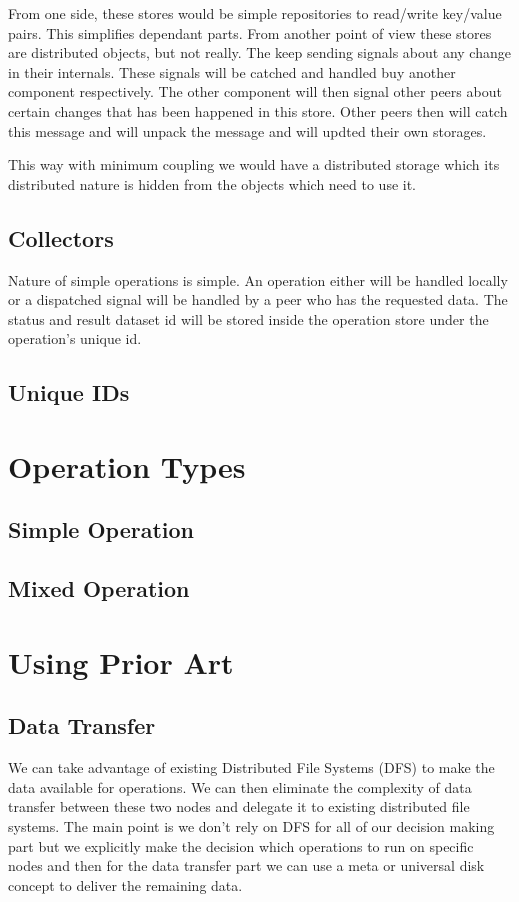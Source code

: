 From one side, these stores would be simple repositories to read/write key/value pairs.
This simplifies dependant parts.
From another point of view these stores are distributed objects, but not really.
The keep sending signals about any change in their internals.
These signals will be catched and handled buy another component respectively.
The other component will then signal other peers about certain changes that has been happened in this store.
Other peers then will catch this message and will unpack the message and will updted their own storages.

This way with minimum coupling we would have a distributed storage which its distributed nature is hidden from
the objects which need to use it.

\subsection{Collectors}
Nature of simple operations is simple. 
An operation either will be handled locally or a dispatched signal will be handled
by a peer who has the requested data. 
The status and result dataset id will be stored inside the operation store under the operation's unique id.



\subsection{Unique IDs}


\section{Operation Types}
\subsection{Simple Operation}
\subsection{Mixed Operation}

\section{Using Prior Art}
\subsection{Data Transfer}
We can take advantage of existing Distributed File Systems
(DFS) to make the data available for operations. We can then eliminate
the complexity of data transfer between these two nodes and delegate it
to existing distributed file systems. The main point is we don't rely on
DFS for all of our decision making part but we explicitly make the 
decision which operations to run on specific nodes and then for the 
data transfer part we can use a meta or universal disk concept to deliver the
remaining data.



